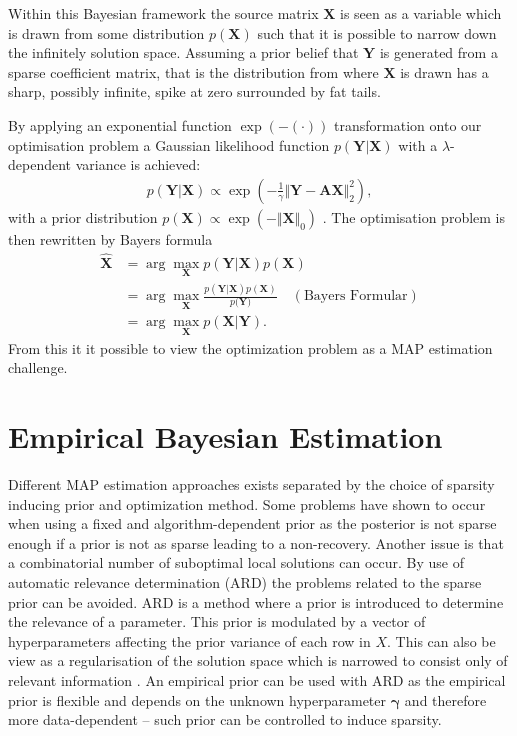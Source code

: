 Within this Bayesian framework the source matrix $\mathbf{X}$ is seen as a variable which is drawn from some distribution $p(\mathbf{X})$ such that it is possible to narrow down the infinitely solution space. 
Assuming a prior belief that $\textbf{Y}$ is generated from a sparse coefficient matrix, that is the distribution from where $\textbf{X}$ is drawn has a sharp, possibly infinite, spike at zero surrounded by fat tails.     

By applying an exponential function $\exp(- (\cdot))$ transformation onto our optimisation problem a Gaussian likelihood function $p(\mathbf{Y} \vert \mathbf{X})$ with a $\lambda$-dependent variance is achieved:
\begin{align*}
p(\mathbf{Y} \vert \mathbf{X}) \propto \exp \left( - \frac{1}{\gamma} \Vert \mathbf{Y} - \mathbf{AX} \Vert_2^2 \right),
\end{align*}
with a prior distribution $p(\mathbf{X}) \propto \exp(- \Vert \mathbf{X} \Vert_0)$ \cite[p. 137]{phd_wipf}. 
The optimisation problem is then rewritten by Bayers formula 
\begin{align*}
\hat{\mathbf{X}} &= \arg \max_{\mathbf{X}} p(\mathbf{Y} \vert \mathbf{X}) p(\mathbf{X}) \\
&= \arg \max_{\mathbf{X}} \frac{p(\mathbf{Y} \vert \mathbf{X}) p(\mathbf{X})}{p(\mathbf{Y)}} \quad (\text{Bayers Formular}) \\
&= \arg \max_{\mathbf{X}} p(\mathbf{X} \vert \mathbf{Y}).
\end{align*}
From this it it possible to view the optimization problem as a MAP estimation challenge.

\section{Empirical Bayesian Estimation}
Different MAP estimation approaches exists separated by the choice of sparsity inducing prior and optimization method. 
Some problems have shown to occur when using a fixed and algorithm-dependent prior as the posterior is not sparse enough if a prior is not as sparse leading to a non-recovery. 
Another issue is that a combinatorial number of suboptimal local solutions can occur.  
By use of automatic relevance determination (ARD) the problems related to the sparse prior can be avoided. 
ARD is a method where a prior is introduced to determine the relevance of a parameter. 
This prior is modulated by a vector of hyperparameters affecting the prior variance of each row in $X$.
This can also be view as a regularisation of the solution space which is narrowed to consist only of relevant information \cite{ARD}.
An empirical prior can be used with ARD as the empirical prior is flexible and depends on the unknown hyperparameter $\boldsymbol{\gamma}$ and therefore more data-dependent -- such prior can be controlled to induce sparsity.

